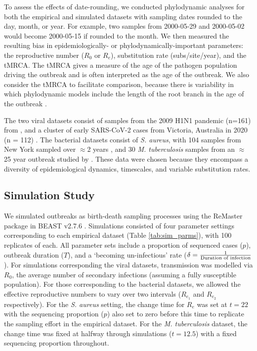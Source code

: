 \documentclass[12pt]{article}
\begin{document}
\begin{spacing}{2}
To assess the effects of date-rounding, we conducted phylodynamic analyses for both the empirical and simulated datasets with sampling dates rounded to the day, month, or year. For example, two samples from 2000-05-29 and 2000-05-02 would become 2000-05-15 if rounded to the month. We then measured the resulting bias in epidemiologically- or phylodynamically-important parameters: the reproductive number ($R_0$ or $R_e$), substitution rate (subs/site/year), and the tMRCA. The tMRCA gives a measure of the age of the pathogen population driving the outbreak and is often interpreted as the age of the outbreak. We also consider the tMRCA to facilitate comparison, because there is variability in which phylodynamic models include the length of the root branch in the age of the outbreak \citep{stadler2012estimating}.

The two viral datasets consist of samples from the 2009 H1N1 pandemic (n=161) from \citet{hedge_2013_real-time}, and a cluster of early SARS-CoV-2 cases from  Victoria, Australia in 2020 (n = 112) \citep{lane2021genomics}. The bacterial datasets consist of \textit{S. aureus}, with 104 samples from New York sampled over $\approx$2 years \citep{duchene_2016_genome,volz_modeling_2018,uhlemann_molecular_2014}, and 30 \textit{M. tuberculosis} samples from an $\approx$25 year outbreak studied by \citet{kuhnert_tuberculosis_2018}. These data were chosen because they encompass a diversity of epidemiological dynamics, timescales, and variable substitution rates.

\subsection*{Simulation Study}
We simulated outbreaks as birth-death sampling processes using the ReMaster package in BEAST v2.7.6 \citep{vaughan_remaster_2024,bouckaert_beast_2019}. Simulations consisted of four parameter settings corresponding to each empirical dataset (Table \ref{tab:sim_parms}), with 100 replicates of each. All parameter sets include a proportion of sequenced cases ($p$), outbreak duration ($T$), and a `becoming un-infectious' rate ($\delta = \frac{1}{\textnormal{Duration of infection}}$). For simulations corresponding the viral datasets, transmission was modelled via $R_0$, the average number of secondary infections (assuming a fully susceptible population). For those corresponding to the bacterial datasets, we allowed the effective reproductive numbers to vary over two intervals ($R_{e_1}$ and $R_{e_2}$ respectively). For the \textit{S. aureus} setting, the change time for $R_e$ was set at $t=22$ with the sequencing proportion ($p$) also set to zero before this time to replicate the sampling effort in the empirical dataset. For the \textit{M. tuberculosis} dataset, the change time was fixed at halfway through simulations ($t=12.5$) with a fixed sequencing proportion throughout.


\end{spacing}
\end{document}
